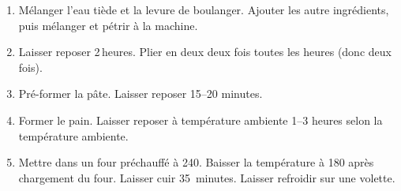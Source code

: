 
\begin{ingredients}
\end{ingredients}


\begin{recipe}
  \begin{enumerate}

  \item Mélanger l'eau tiède et la levure de boulanger.  Ajouter les
    autre ingrédients, puis mélanger et pétrir à la machine.
    
  \item Laisser reposer 2$\,$\fracH heures.  Plier en deux deux fois toutes
    les heures (donc deux fois).
    
  \item Pré-former la pâte.  Laisser reposer 15--20 minutes.
    
  \item Former le pain.  Laisser reposer à température ambiente 1--3
    heures selon la température ambiente.
    
  \item Mettre dans un four préchauffé à 240\degreeC.  Baisser la
    température à 180\degreeC{} après chargement du four.  Laisser cuir
    35~minutes.  Laisser refroidir sur une volette.

  \end{enumerate}
\end{recipe}

